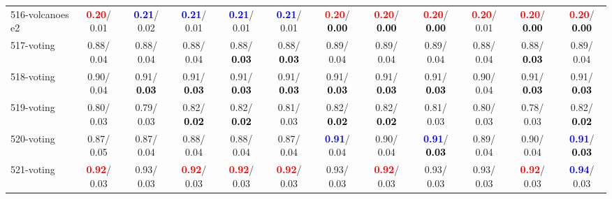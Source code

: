 \begin{table}[h]
\begin{center}
{\begin{tabular}{lc|c|c|c|c|c|c|c|c|c|c}
516-volcanoes e2 & \textcolor{red}{\textbf{  0.20}}/  0.01 & \textcolor{blue}{\textbf{  0.21}}/  0.02 & \textcolor{blue}{\textbf{  0.21}}/  0.01 & \textcolor{blue}{\textbf{  0.21}}/  0.01 & \textcolor{blue}{\textbf{  0.21}}/  0.01 & \textcolor{red}{\textbf{  0.20}}/\textcolor{black}{\textbf{  0.00}} & \textcolor{red}{\textbf{  0.20}}/\textcolor{black}{\textbf{  0.00}} & \textcolor{red}{\textbf{  0.20}}/\textcolor{black}{\textbf{  0.00}} & \textcolor{red}{\textbf{  0.20}}/  0.01 & \textcolor{red}{\textbf{  0.20}}/\textcolor{black}{\textbf{  0.00}} & \textcolor{red}{\textbf{  0.20}}/\textcolor{black}{\textbf{  0.00}} \\
517-voting &   0.88/  0.04 &   0.88/  0.04 &   0.88/  0.04 &   0.88/\textcolor{black}{\textbf{  0.03}} &   0.88/\textcolor{black}{\textbf{  0.03}} &   0.89/  0.04 &   0.89/  0.04 &   0.89/  0.04 &   0.88/  0.04 &   0.88/\textcolor{black}{\textbf{  0.03}} &   0.89/  0.04 \\
518-voting &   0.90/  0.04 &   0.91/\textcolor{black}{\textbf{  0.03}} &   0.91/\textcolor{black}{\textbf{  0.03}} &   0.91/\textcolor{black}{\textbf{  0.03}} &   0.91/\textcolor{black}{\textbf{  0.03}} &   0.91/\textcolor{black}{\textbf{  0.03}} &   0.91/\textcolor{black}{\textbf{  0.03}} &   0.91/\textcolor{black}{\textbf{  0.03}} &   0.90/  0.04 &   0.91/\textcolor{black}{\textbf{  0.03}} &   0.91/\textcolor{black}{\textbf{  0.03}} \\
519-voting &   0.80/  0.03 &   0.79/  0.03 &   0.82/\textcolor{black}{\textbf{  0.02}} &   0.82/\textcolor{black}{\textbf{  0.02}} &   0.81/  0.03 &   0.82/\textcolor{black}{\textbf{  0.02}} &   0.82/\textcolor{black}{\textbf{  0.02}} &   0.81/  0.03 &   0.80/  0.03 &   0.78/  0.03 &   0.82/\textcolor{black}{\textbf{  0.02}} \\ \hline
520-voting &   0.87/  0.05 &   0.87/  0.04 &   0.88/  0.04 &   0.88/  0.04 &   0.87/  0.04 & \textcolor{blue}{\textbf{  0.91}}/  0.04 &   0.90/  0.04 & \textcolor{blue}{\textbf{  0.91}}/\textcolor{black}{\textbf{  0.03}} &   0.89/  0.04 &   0.90/  0.04 & \textcolor{blue}{\textbf{  0.91}}/\textcolor{black}{\textbf{  0.03}} \\
521-voting & \textcolor{red}{\textbf{  0.92}}/  0.03 &   0.93/  0.03 & \textcolor{red}{\textbf{  0.92}}/  0.03 & \textcolor{red}{\textbf{  0.92}}/  0.03 & \textcolor{red}{\textbf{  0.92}}/  0.03 &   0.93/  0.03 & \textcolor{red}{\textbf{  0.92}}/  0.03 &   0.93/  0.03 &   0.93/  0.03 & \textcolor{red}{\textbf{  0.92}}/  0.03 & \textcolor{blue}{\textbf{  0.94}}/  0.03 \\

\end{tabular}}
\end{center}
\end{table}
